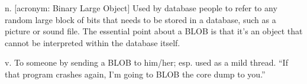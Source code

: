 
\begin{inparaenum}
\item n. [acronym: Binary Large Object] Used by database people to refer to any
    random large block of bits that needs to be stored in a database, such as a
    picture or sound file. The essential point about a BLOB is that it's an
    object that cannot be interpreted within the database itself.
\item v. To  someone by sending a BLOB to him/her; esp. used
    as a mild thread. ``If that program crashes again, I'm going to BLOB the
    core dump to you.''
\end{inparaenum}

